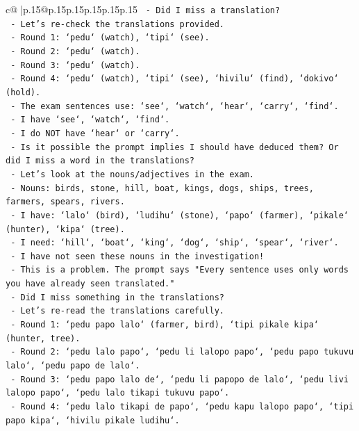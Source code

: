 \documentclass{article}
\begin{document}
{\begin{supertabular}{c@{$\;$}|p{.15\linewidth}@{}p{.15\linewidth}p{.15\linewidth}p{.15\linewidth}p{.15\linewidth}p{.15\linewidth}}
{{{\texttt{    {-} Did I miss a translation?} \\
\texttt{    {-} Let's re{-}check the translations provided.} \\
\texttt{    {-} Round 1: `pedu` (watch), `tipi` (see).} \\
\texttt{    {-} Round 2: `pedu` (watch).} \\
\texttt{    {-} Round 3: `pedu` (watch).} \\
\texttt{    {-} Round 4: `pedu` (watch), `tipi` (see), `hivilu` (find), `dokivo` (hold).} \\
\texttt{    {-} The exam sentences use: `see`, `watch`, `hear`, `carry`, `find`.} \\
\texttt{    {-} I have `see`, `watch`, `find`.} \\
\texttt{    {-} I do NOT have `hear` or `carry`.} \\
\texttt{    {-} Is it possible the prompt implies I should have deduced them? Or did I miss a word in the translations?} \\
\texttt{    {-} Let's look at the nouns/adjectives in the exam.} \\
\texttt{    {-} Nouns: birds, stone, hill, boat, kings, dogs, ships, trees, farmers, spears, rivers.} \\
\texttt{    {-} I have: `lalo` (bird), `ludihu` (stone), `papo` (farmer), `pikale` (hunter), `kipa` (tree).} \\
\texttt{    {-} I need: `hill`, `boat`, `king`, `dog`, `ship`, `spear`, `river`.} \\
\texttt{    {-} I have not seen these nouns in the investigation!} \\
\texttt{    {-} This is a problem. The prompt says "Every sentence uses only words you have already seen translated."} \\
\texttt{    {-} Did I miss something in the translations?} \\
\texttt{    {-} Let's re{-}read the translations carefully.} \\
\texttt{    {-} Round 1: `pedu papo lalo` (farmer, bird), `tipi pikale kipa` (hunter, tree).} \\
\texttt{    {-} Round 2: `pedu lalo papo`, `pedu li lalopo papo`, `pedu papo tukuvu lalo`, `pedu papo de lalo`.} \\
\texttt{    {-} Round 3: `pedu papo lalo de`, `pedu li papopo de lalo`, `pedu livi lalopo papo`, `pedu lalo tikapi tukuvu papo`.} \\
\texttt{    {-} Round 4: `pedu lalo tikapi de papo`, `pedu kapu lalopo papo`, `tipi papo kipa`, `hivilu pikale ludihu`.} \\
}}}
\end{supertabular}}
\end{document}
